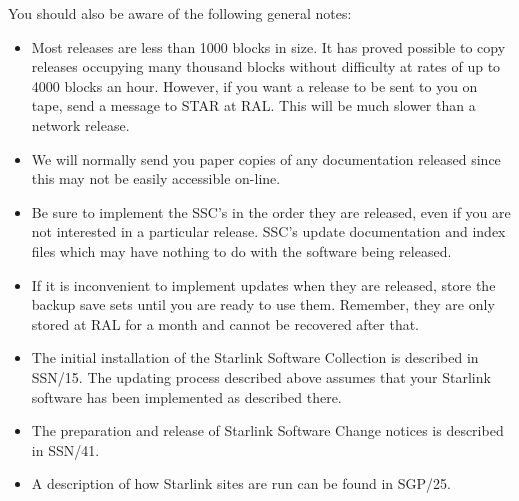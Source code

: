You should also be aware of the following general notes:
\begin{itemize}
\item Most releases are less than 1000 blocks in size.
It has proved possible to copy releases occupying many thousand blocks without
difficulty at rates of up to 4000 blocks an hour.
However, if you want a release to be sent to you on tape, send a message to
STAR at RAL.
This will be much slower than a network release.
\item We will normally send you paper copies of any documentation released since
this may not be easily accessible on-line.
\item Be sure to implement the SSC's in the order they are released, even if
you are not interested in a particular release.
SSC's update documentation and index files which may have nothing to do with the
software being released.
\item If it is inconvenient to implement updates when they are released,
store the backup save sets until you are ready to use them.
Remember, they are only stored at RAL for a month and cannot be recovered after
that.
\item The initial installation of the Starlink Software Collection is
described in SSN/15.
The updating process described above assumes that your Starlink software has
been implemented as described there.
\item The preparation and release of Starlink Software Change notices is
described in SSN/41.
\item A description of how Starlink sites are run can be found in SGP/25.
\end{itemize}

